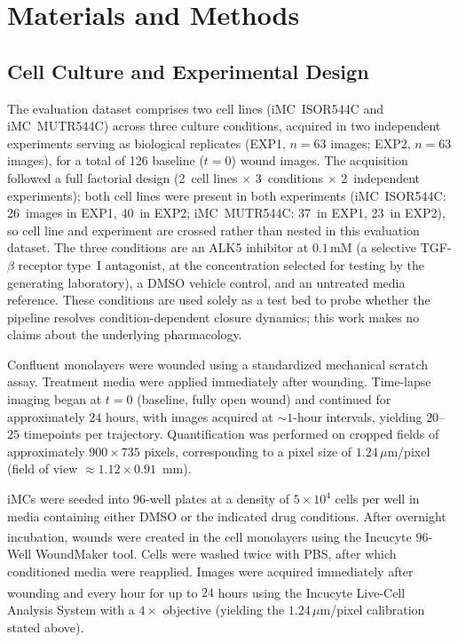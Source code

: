 \section{Materials and Methods}

\subsection{Cell Culture and Experimental Design}

The evaluation dataset comprises two cell lines (iMC~ISOR544C and iMC~MUTR544C) across three culture conditions, acquired in two independent experiments serving as biological replicates (EXP1, $n = 63$ images; EXP2, $n = 63$ images), for a total of 126 baseline ($t = 0$) wound images. The acquisition followed a full factorial design (2~cell lines $\times$ 3~conditions $\times$ 2~independent experiments); both cell lines were present in both experiments (iMC~ISOR544C: 26~images in EXP1, 40~in EXP2; iMC~MUTR544C: 37~in EXP1, 23~in EXP2), so cell line and experiment are crossed rather than nested in this evaluation dataset. The three conditions are an ALK5 inhibitor at $0.1\,\mathrm{mM}$ (a selective TGF-$\beta$ receptor type~I antagonist, at the concentration selected for testing by the generating laboratory), a DMSO vehicle control, and an untreated media reference. These conditions are used solely as a test bed to probe whether the pipeline resolves condition-dependent closure dynamics; this work makes no claims about the underlying pharmacology.


Confluent monolayers were wounded using a standardized mechanical scratch assay. Treatment media were applied immediately after wounding. Time-lapse imaging began at $t = 0$ (baseline, fully open wound) and continued for approximately $24$ hours, with images acquired at ${\sim}1$-hour intervals, yielding $20$--$25$ timepoints per trajectory. Quantification was performed on cropped fields of approximately $900 \times 735$ pixels, corresponding to a pixel size of $1.24\,\mu$m/pixel (field of view ${\approx}1.12 \times 0.91$~mm).

iMCs were seeded into $96$-well plates at a density of $5 \times 10^{4}$ cells per well in media containing either DMSO or the indicated drug conditions. After overnight incubation, wounds were created in the cell monolayers using the Incucyte\textsuperscript{\textregistered} $96$-Well WoundMaker tool. Cells were washed twice with PBS, after which conditioned media were reapplied. Images were acquired immediately after wounding and every hour for up to $24$ hours using the Incucyte\textsuperscript{\textregistered} Live-Cell Analysis System with a $4\times$ objective (yielding the $1.24\,\mu$m/pixel calibration stated above).

